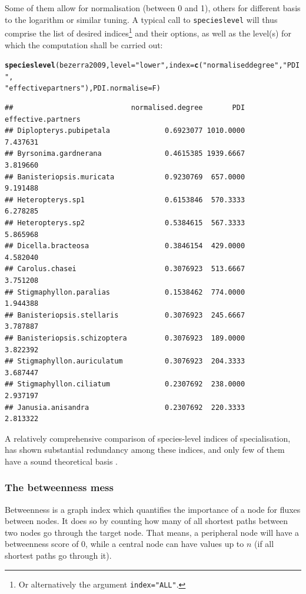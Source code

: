 \documentclass[a4paper, 11pt]{article}\usepackage[]{graphicx}\usepackage[dvipsnames]{xcolor}
\makeatletter
\newcommand{\hlstr}[1]{\textcolor[rgb]{0.192,0.494,0.8}{#1}}%
\newcommand{\hlstd}[1]{\textcolor[rgb]{0.345,0.345,0.345}{#1}}%
\newcommand{\hlkwc}[1]{\textcolor[rgb]{0.333,0.667,0.333}{#1}}%
\newcommand{\hlkwd}[1]{\textcolor[rgb]{0.737,0.353,0.396}{\textbf{#1}}}%
\newenvironment{kframe}{%
 \def\at@end@of@kframe{}%
 \ifinner\ifhmode%
  \def\at@end@of@kframe{\end{minipage}}%
  \begin{minipage}{\columnwidth}%
 \fi\fi%
 \def\FrameCommand##1{\hskip\@totalleftmargin \hskip-\fboxsep
 \colorbox{shadecolor}{##1}\hskip-\fboxsep
     \hskip-\linewidth \hskip-\@totalleftmargin \hskip\columnwidth}%
 \MakeFramed {\advance\hsize-\width
   \@totalleftmargin\z@ \linewidth\hsize
   \@setminipage}}%
 {\par\unskip\endMakeFramed%
 \at@end@of@kframe}
\newenvironment{knitrout}{}{} %
\makeatother
\begin{document}
\noindent Some of them allow for normalisation (between 0 and 1), others for different basis to the logarithm or similar tuning. A typical call to \texttt{specieslevel} will thus comprise the list of desired indices\footnote{Or alternatively the argument \texttt{index="ALL"}.} and their options, as well as the level(s) for which the computation shall be carried out:
\begin{knitrout}
\color{fgcolor}\begin{kframe}
\begin{alltt}
\hlkwd{specieslevel}\hlstd{(bezerra2009,} \hlkwc{level}\hlstd{=}\hlstr{"lower"}\hlstd{,} \hlkwc{index}\hlstd{=}\hlkwd{c}\hlstd{(}\hlstr{"normalised degree"}\hlstd{,} \hlstr{"PDI"}\hlstd{,}
      \hlstr{"effective partners"}\hlstd{),} \hlkwc{PDI.normalise}\hlstd{=F)}
\end{alltt}
\begin{verbatim}
##                            normalised.degree       PDI effective.partners
## Diplopterys.pubipetala             0.6923077 1010.0000           7.437631
## Byrsonima.gardnerana               0.4615385 1939.6667           3.819660
## Banisteriopsis.muricata            0.9230769  657.0000           9.191488
## Heteropterys.sp1                   0.6153846  570.3333           6.278285
## Heteropterys.sp2                   0.5384615  567.3333           5.865968
## Dicella.bracteosa                  0.3846154  429.0000           4.582040
## Carolus.chasei                     0.3076923  513.6667           3.751208
## Stigmaphyllon.paralias             0.1538462  774.0000           1.944388
## Banisteriopsis.stellaris           0.3076923  245.6667           3.787887
## Banisteriopsis.schizoptera         0.3076923  189.0000           3.822392
## Stigmaphyllon.auriculatum          0.3076923  204.3333           3.687447
## Stigmaphyllon.ciliatum             0.2307692  238.0000           2.937197
## Janusia.anisandra                  0.2307692  220.3333           2.813322
\end{verbatim}
\end{kframe}
\end{knitrout}
A relatively comprehensive comparison of species-level indices of specialisation, \citet{Dormann2011} has shown substantial redundancy among these indices, and only few of them have a sound theoretical basis \citep{Poisot2012a}.

\subsubsection{The betweenness mess}
Betweenness is a graph index which quantifies the importance of a node for fluxes between nodes. It does so by counting how many of all shortest paths between two nodes go through the target node. That means, a peripheral node will have a betweenness score of 0, while a central node can have values up to $n$ (if all shortest paths go through it).
\end{document}
